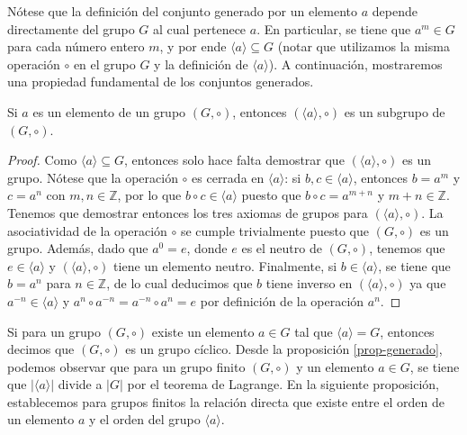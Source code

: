 Nótese que la definición del conjunto generado por un elemento $a$
depende directamente del grupo $G$ al cual pertenece $a$. En
particular, se tiene que $a^m\in G$ para cada número entero $m$, y
por ende $\langle a\rangle\subseteq G$ (notar que utilizamos la misma
operación $\circ$ en el grupo $G$ y la definición de $\langle
a \rangle$). A continuación, mostraremos una propiedad fundamental de
los conjuntos generados.


\begin{proposition}\label{prop-generado}
	Si $a$ es un elemento de un grupo $(G,\circ)$, entonces $(\langle a\rangle ,\circ)$ es un subgrupo de $(G,\circ)$. 
\end{proposition} 


\begin{proof}
Como $\langle a\rangle\subseteq G$, entonces solo hace falta demostrar
que $(\langle a\rangle,\circ)$ es un grupo. Nótese que la operación
$\circ$ es cerrada en $\langle a\rangle$: si $b,c \in \langle
a\rangle$, entonces $b = a^m$ y $c = a^n$ con $m,n \in \mathbb{Z}$,
por lo que $b \circ c \in \langle a\rangle$ puesto que $b \circ c =
a^{m+n}$ y $m+n \in \mathbb{Z}$. Tenemos que demostrar entonces los
tres axiomas de grupos para $(\langle a\rangle, \circ)$. La
asociatividad de la operación $\circ$ se cumple trivialmente puesto
que $(G,\circ)$ es un grupo. Además, dado que $a^0 = e$, donde $e$ es
el neutro de $(G, \circ)$, tenemos que $e \in \langle a\rangle$ y
$(\langle a\rangle, \circ)$ tiene un elemento neutro. Finalmente, si
$b \in \langle a\rangle$, se tiene que $b = a^n$ para
$n \in \mathbb{Z}$, de lo cual deducimos que $b$ tiene inverso en
$(\langle a\rangle, \circ)$ ya que $a^{-n} \in \langle
a\rangle$ y $a^n \circ a^{-n} = a^{-n} \circ a^n = e$ por definición de la operación $a^n$.
\end{proof}

Si para un grupo $(G, \circ)$ existe un elemento $a \in G$ tal que
$\langle a \rangle = G$, entonces decimos que $(G,\circ)$ es un grupo
cíclico. Desde la proposición \ref{prop-generado}, podemos observar
que para un grupo finito $(G, \circ)$ y un elemento $a \in G$, se
tiene que $|\langle a\rangle |$ divide a $|G|$ por el teorema de
Lagrange. En la siguiente proposición, establecemos para grupos
finitos la relación directa que existe entre el orden de un elemento
$a$ y el orden del grupo $\langle a \rangle$.


